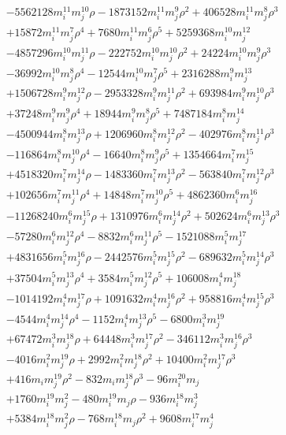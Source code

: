 {\begin{align*}
&-5562128m_i^{11}m_j^{10}\rho-1873152m_i^{11}m_j^{9}\rho^{2}+406528m_i^{11}m_j^{8}\rho^{3}\\
&+15872m_i^{11}m_j^{7}\rho^{4}+7680m_i^{11}m_j^{6}\rho^{5}+5259368m_i^{10}m_j^{12}\\
&-4857296m_i^{10}m_j^{11}\rho-222752m_i^{10}m_j^{10}\rho^{2}+24224m_i^{10}m_j^{9}\rho^{3}\\
&-36992m_i^{10}m_j^{8}\rho^{4}-12544m_i^{10}m_j^{7}\rho^{5}+2316288m_i^{9}m_j^{13}\\
&+1506728m_i^{9}m_j^{12}\rho-2953328m_i^{9}m_j^{11}\rho^{2}+693984m_i^{9}m_j^{10}\rho^{3}\\
&+37248m_i^{9}m_j^{9}\rho^{4}+18944m_i^{9}m_j^{8}\rho^{5}+7487184m_i^{8}m_j^{14}\\
&-4500944m_i^{8}m_j^{13}\rho+1206960m_i^{8}m_j^{12}\rho^{2}-402976m_i^{8}m_j^{11}\rho^{3}\\
&-116864m_i^{8}m_j^{10}\rho^{4}-16640m_i^{8}m_j^{9}\rho^{5}+1354664m_i^{7}m_j^{15}\\
&+4518320m_i^{7}m_j^{14}\rho-1483360m_i^{7}m_j^{13}\rho^{2}-563840m_i^{7}m_j^{12}\rho^{3}\\
&+102656m_i^{7}m_j^{11}\rho^{4}+14848m_i^{7}m_j^{10}\rho^{5}+4862360m_i^{6}m_j^{16}\\
&-11268240m_i^{6}m_j^{15}\rho+1310976m_i^{6}m_j^{14}\rho^{2}+502624m_i^{6}m_j^{13}\rho^{3}\\
&-57280m_i^{6}m_j^{12}\rho^{4}-8832m_i^{6}m_j^{11}\rho^{5}-1521088m_i^{5}m_j^{17}\\
&+4831656m_i^{5}m_j^{16}\rho-2442576m_i^{5}m_j^{15}\rho^{2}-689632m_i^{5}m_j^{14}\rho^{3}\\
&+37504m_i^{5}m_j^{13}\rho^{4}+3584m_i^{5}m_j^{12}\rho^{5}+106008m_i^{4}m_j^{18}\\
&-1014192m_i^{4}m_j^{17}\rho+1091632m_i^{4}m_j^{16}\rho^{2}+958816m_i^{4}m_j^{15}\rho^{3}\\
&-4544m_i^{4}m_j^{14}\rho^{4}-1152m_i^{4}m_j^{13}\rho^{5}-6800m_i^{3}m_j^{19}\\
&+67472m_i^{3}m_j^{18}\rho+64448m_i^{3}m_j^{17}\rho^{2}-346112m_i^{3}m_j^{16}\rho^{3}\\
&-4016m_i^{2}m_j^{19}\rho+2992m_i^{2}m_j^{18}\rho^{2}+10400m_i^{2}m_j^{17}\rho^{3}\\
&+416m_im_j^{19}\rho^{2}-832m_im_j^{18}\rho^{3}-96m_i^{20}m_j\\
&+1760m_i^{19}m_j^{2}-480m_i^{19}m_j\rho-936m_i^{18}m_j^{3}\\
&+5384m_i^{18}m_j^{2}\rho-768m_i^{18}m_j\rho^{2}+9608m_i^{17}m_j^{4}\\

\end{align*}}
